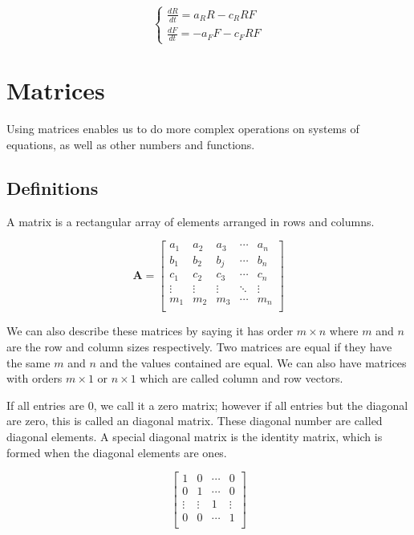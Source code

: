         \begin{equation}\label{eq:LVeq}
        \begin{cases}
        \frac{dR}{dt} = a_R R - c_R RF\\
        \frac{dF}{dt} = -a_F F - c_F RF
        \end{cases}
        \end{equation}

\section{Matrices}
    Using matrices enables us to do more complex operations on systems of equations, as well as other numbers and functions.

    \subsection{Definitions}
    A matrix is a rectangular array of elements arranged in rows and columns.

    \begin{equation}\label{eq:matrixdef}
    \mathbf{A} =
    \left[ \begin{matrix}
        a_1 & a_2 & a_3 & \cdots & a_n\\
        b_1 & b_2 & b_j & \cdots & b_n\\
        c_1 & c_2 & c_3 & \cdots & c_n\\
        \vdots & \vdots & \vdots & \ddots & \vdots\\
        m_1 & m_2 & m_3 & \cdots & m_n\\
    \end{matrix} \right]
    \end{equation}

    We can also describe these matrices by saying it has order $m \times n$ where $m$ and $n$ are the row and column sizes respectively. Two matrices are equal if they have the same $m$ and $n$ and the values contained are equal. We can also have matrices with orders $m \times 1$ or $n \times 1$ which are called column and row vectors.

    If all entries are 0, we call it a zero matrix; however if all entries but the diagonal are zero, this is called an diagonal matrix. These diagonal number are called diagonal elements. A special diagonal matrix is the identity matrix, which is formed when the diagonal elements are ones.

    \begin{equation}\label{eq:id_matrix}
        \left[ \begin{array}{cccc}
        1 & 0 & \cdots & 0\\
        0 & 1 & \cdots & 0\\
        \vdots & \vdots & 1 & \vdots\\
        0 & 0 & \cdots & 1\\
        \end{array} \right]
    \end{equation}

